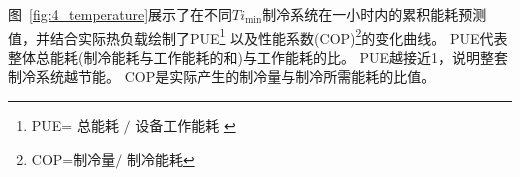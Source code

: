 图~\ref{fig:4_temperature}展示了在不同$Ti_{\min}$制冷系统在一小时内的累积能耗预测值，并结合实际热负载绘制了PUE\footnote{PUE\text{ }=${\text {  总能耗 }}/{\text { 设备工作能耗 }}$\cite{song2015data}} 以及性能系数(COP)\footnote{COP\text{ }=${\text {制冷量}}/{\text { 制冷能耗}}$\cite{song2015data}}的变化曲线。
PUE代表整体总能耗(制冷能耗与工作能耗的和)与工作能耗的比。
PUE越接近1，说明整套制冷系统越节能。
COP是实际产生的制冷量与制冷所需能耗的比值。


